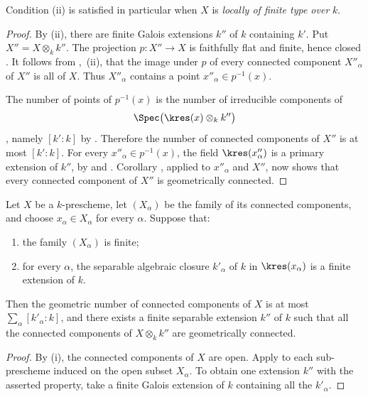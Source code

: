 Condition (ii) is satisfied in particular when $X$ is \emph{locally of
finite type over} $k$.

\begin{proof}
By (ii), there are finite Galois extensions $k''$ of $k$ containing
$k'$.
Put $X''=X\otimes_k k''$.
The projection $p:X''\to X$ is faithfully flat and finite, hence
closed .
It follows from ,~(ii), that the image under $p$ of
every connected component $X''_\alpha$ of $X''$ is all of $X$.
Thus $X''_\alpha$ contains a point
$x''_\alpha\in p^{-1}(x)$.

The number of points of $p^{-1}(x)$ is the number of irreducible
components of
\[
\Spec\bigl(\kres(x)\otimes_k k''\bigr)
\]
, namely $[k':k]$ by .
Therefore the number of connected components of $X''$ is at most
$[k':k]$.
For every $x''_\alpha\in p^{-1}(x)$, the field
$\kres(x''_\alpha)$ is a primary extension of $k''$, by
 and .
Corollary , applied to $x''_\alpha$ and $X''$, now
shows that every connected component of $X''$ is geometrically
connected.
\end{proof}

\begin{corollary}[4.5.16]
\label{IV.4.5.16}
Let $X$ be a $k$-prescheme, let $(X_\alpha)$ be the family of its
connected components, and choose $x_\alpha\in X_\alpha$ for every
$\alpha$.
Suppose that:
\begin{enumerate}
\item[\rm(i)]
\label{IV.4.5.16.i}
the family $(X_\alpha)$ is finite;

\item[\rm(ii)]
\label{IV.4.5.16.ii}
for every $\alpha$, the separable algebraic closure $k'_\alpha$ of
$k$ in $\kres(x_\alpha)$ is a finite extension of $k$.
\end{enumerate}
Then the geometric number of connected components of $X$ is at most $\sum_\alpha[k'_\alpha:k]$,
and there exists a finite separable extension $k''$ of $k$ such that
all the connected components of $X\otimes_k k''$ are geometrically
connected.
\end{corollary}

\begin{proof}
By (i), the connected components of $X$ are open.
Apply  to each sub-prescheme induced on the open
subset $X_\alpha$.
To obtain one extension $k''$ with the asserted property, take a
finite Galois extension of $k$ containing all the $k'_\alpha$.
\end{proof}

